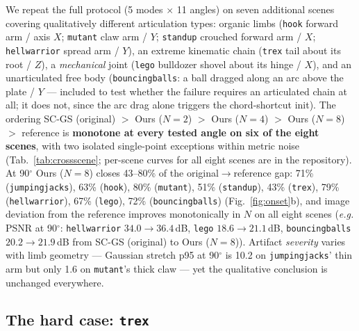 \documentclass[10pt,twocolumn]{article}
\newcommand{\scgsOrig}{SC-GS (original)}
\newcommand{\ours}[1]{Ours ($N{=}#1$)}
\newcommand{\eg}{\emph{e.g.}}
\begin{document}
We repeat the full protocol (5 modes $\times$ 11 angles) on seven additional
scenes covering qualitatively different articulation types: organic limbs
(\texttt{hook} forward arm / axis $X$; \texttt{mutant} claw arm / $Y$;
\texttt{standup} crouched forward arm / $X$; \texttt{hellwarrior} spread arm /
$Y$), an extreme kinematic chain (\texttt{trex} tail about its root / $Z$), a
\emph{mechanical} joint (\texttt{lego} bulldozer shovel about its hinge / $X$),
and an unarticulated free body (\texttt{bouncingballs}: a ball dragged along an
arc above the plate / $Y$ --- included to test whether the failure requires an
articulated chain at all; it does not, since the arc drag alone triggers the
chord-shortcut init). The ordering \scgsOrig{} $>$ \ours{2} $>$ \ours{4} $>$
\ours{8} $>$ reference is \textbf{monotone at every tested angle on six of the
eight scenes}, with two isolated single-point exceptions within metric noise
(Tab.~\ref{tab:crossscene}; per-scene curves for all
eight scenes are in the repository). At 90$^\circ$ \ours{8}
closes 43--80\% of the original$\rightarrow$reference gap: 71\%
(\texttt{jumpingjacks}), 63\% (\texttt{hook}), 80\% (\texttt{mutant}), 51\%
(\texttt{standup}), 43\% (\texttt{trex}), 79\% (\texttt{hellwarrior}), 67\%
(\texttt{lego}), 72\% (\texttt{bouncingballs}) (Fig.~\ref{fig:onset}b), and
image deviation from the reference improves monotonically in $N$ on all eight
scenes (\eg{} PSNR at 90$^\circ$: \texttt{hellwarrior} $34.0 \rightarrow
36.4$\,dB, \texttt{lego} $18.6 \rightarrow 21.1$\,dB, \texttt{bouncingballs}
$20.2 \rightarrow 21.9$\,dB from \scgsOrig{} to \ours{8}). Artifact
\emph{severity} varies with limb geometry --- Gaussian stretch p95 at
90$^\circ$ is 10.2 on \texttt{jumpingjacks}' thin arm but only 1.6 on
\texttt{mutant}'s thick claw --- yet the qualitative conclusion is unchanged
everywhere.

\subsection{The hard case: \texttt{trex}}
\label{sec:hardcase}
\end{document}
